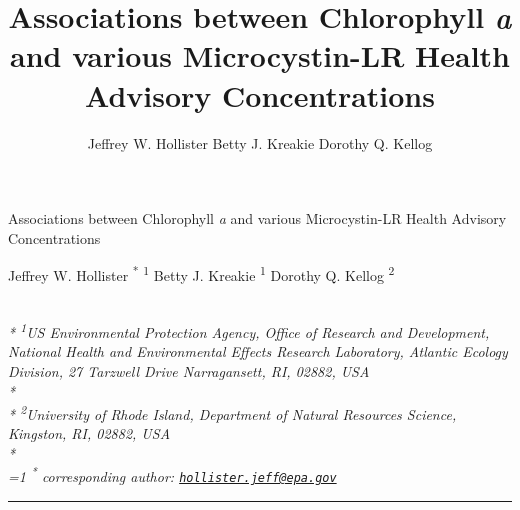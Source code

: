 \documentclass[11pt,]{article}
\title{Associations between Chlorophyll \emph{a} and various Microcystin-LR
Health Advisory Concentrations}
\author{
Jeffrey W. Hollister
Betty J. Kreakie
Dorothy Q. Kellog
}
\date{}
\begin{document}
\begin{singlespace}
\begin{center}
\huge Associations between Chlorophyll \emph{a} and various Microcystin-LR
Health Advisory Concentrations
\end{center}
\begin{center}
\large
Jeffrey W. Hollister \textsuperscript{*} \textsuperscript{1} 
Betty J. Kreakie \textsuperscript{1} 
Dorothy Q. Kellog \textsuperscript{2} 
\end{center}
\begin{justify}
\footnotesize \emph{ 
\\*
\textsuperscript{1}US Environmental Protection Agency, Office of Research and Development,
National Health and Environmental Effects Research Laboratory, Atlantic
Ecology Division, 27 Tarzwell Drive Narragansett, RI, 02882, USA\\*
\\*
\textsuperscript{2}University of Rhode Island, Department of Natural Resources Science,
Kingston, RI, 02882, USA\\*
}
\setcounter{num}{1}
\\[0.1cm]
\footnotesize \emph{ 
\ifnum\value{num}=1%
\textsuperscript{*} corresponding author:
\fi
\href{mailto:hollister.jeff@epa.gov}{\nolinkurl{hollister.jeff@epa.gov}}
}
\end{justify}
\normalsize

\end{singlespace}


\singlespace

\vspace{2mm}

\hrule
\end{document}
